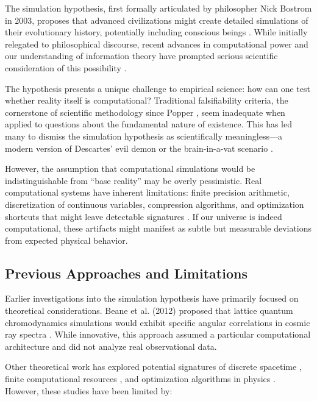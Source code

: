 \documentclass[12pt,a4paper]{article}
\begin{document}
The simulation hypothesis, first formally articulated by philosopher Nick Bostrom in 2003, proposes that advanced civilizations might create detailed simulations of their evolutionary history, potentially including conscious beings \cite{bostrom2003}. While initially relegated to philosophical discourse, recent advances in computational power and our understanding of information theory have prompted serious scientific consideration of this possibility \cite{tegmark2014, lloyd2002}.

The hypothesis presents a unique challenge to empirical science: how can one test whether reality itself is computational? Traditional falsifiability criteria, the cornerstone of scientific methodology since Popper \cite{popper1959}, seem inadequate when applied to questions about the fundamental nature of existence. This has led many to dismiss the simulation hypothesis as scientifically meaningless—a modern version of Descartes' evil demon or the brain-in-a-vat scenario \cite{putnam1981}.

However, the assumption that computational simulations would be indistinguishable from ``base reality'' may be overly pessimistic. Real computational systems have inherent limitations: finite precision arithmetic, discretization of continuous variables, compression algorithms, and optimization shortcuts that might leave detectable signatures \cite{fredkin1990, wolfram2002}. If our universe is indeed computational, these artifacts might manifest as subtle but measurable deviations from expected physical behavior.

\subsection{Previous Approaches and Limitations}

Earlier investigations into the simulation hypothesis have primarily focused on theoretical considerations. Beane et al. (2012) proposed that lattice quantum chromodynamics simulations would exhibit specific angular correlations in cosmic ray spectra \cite{beane2012}. While innovative, this approach assumed a particular computational architecture and did not analyze real observational data.

Other theoretical work has explored potential signatures of discrete spacetime \cite{amelino2013}, finite computational resources \cite{lloyd2002}, and optimization algorithms in physics \cite{fredkin1990}. However, these studies have been limited by:
\end{document}
